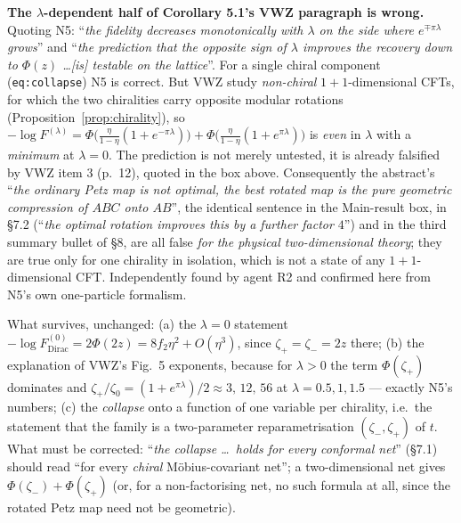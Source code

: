 \documentclass[11pt]{article}
\begin{document}
\begin{verdictbreak}
\textbf{The $\lambda$-dependent half of Corollary 5.1's VWZ paragraph is wrong.}  Quoting N5:
``\emph{the fidelity decreases monotonically with $\lambda$ on the side where $e^{\mp\pi\lambda}$
grows}'' and ``\emph{the prediction that the opposite sign of $\lambda$ improves the recovery down
to $\Phi(z)$ \dots [is] testable on the lattice}''.  For a single chiral component
(\texttt{eq:collapse}) N5 is correct.  But VWZ study \emph{non-chiral} $1{+}1$-dimensional CFTs,
for which the two chiralities carry opposite modular rotations
(Proposition~\ref{prop:chirality}), so
$-\log F^{(\lambda)}=\Phi\bigl(\tfrac{\eta}{1-\eta}(1+e^{-\pi\lambda})\bigr)
+\Phi\bigl(\tfrac{\eta}{1-\eta}(1+e^{\pi\lambda})\bigr)$ is \emph{even} in $\lambda$ with a
\emph{minimum} at $\lambda=0$.  The prediction is not merely untested, it is already falsified by
VWZ item 3 (p.~12), quoted in the box above.  Consequently the abstract's
``\emph{the ordinary Petz map is not optimal, the best rotated map is the pure geometric
compression of $ABC$ onto $AB$}'', the identical sentence in the Main-result box, in
\S7.2 (``\emph{the optimal rotation improves this by a further factor $4$}'') and in the third
summary bullet of \S8, are all false \emph{for the physical two-dimensional theory}; they are true
only for one chirality in isolation, which is not a state of any $1{+}1$-dimensional CFT.
Independently found by agent R2 and confirmed here from N5's own one-particle formalism.
\end{verdictbreak}
\begin{verdictok}
What survives, unchanged: (a) the $\lambda=0$ statement
$-\log F^{(0)}_{\mathrm{Dirac}}=2\Phi(2z)=8f_2\eta^2+O(\eta^3)$, since $\zeta_+=\zeta_-=2z$ there;
(b) the explanation of VWZ's Fig.~5 exponents, because for $\lambda>0$ the term $\Phi(\zeta_+)$
dominates and $\zeta_+/\zeta_0=(1+e^{\pi\lambda})/2\approx3,\,12,\,56$ at
$\lambda=0.5,1,1.5$ --- exactly N5's numbers; (c) the \emph{collapse} onto a function of one
variable per chirality, i.e.\ the statement that the family is a two-parameter reparametrisation
$(\zeta_-,\zeta_+)$ of $t$.  What must be corrected: ``\emph{the collapse \dots\ holds for every
conformal net}'' (\S7.1) should read ``for every \emph{chiral} M\"obius-covariant net''; a
two-dimensional net gives $\Phi(\zeta_-)+\Phi(\zeta_+)$ (or, for a non-factorising net, no such
formula at all, since the rotated Petz map need not be geometric).
\end{verdictok}
\end{document}
